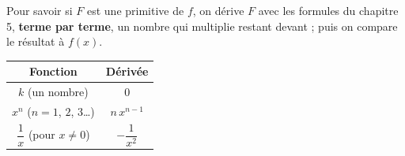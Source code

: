 \documentclass[11pt,a4paper]{article}
\begin{document}
\begin{remarquebox}
\begin{minipage}[c]{0.5\linewidth}\raggedright
Pour savoir si $F$ est une primitive de $f$, on dérive $F$ avec les formules du
chapitre 5, \textbf{terme par terme}, un nombre qui multiplie restant devant ; puis on
compare le résultat à $f(x)$.
\end{minipage}\hfill
\begin{minipage}[c]{0.46\linewidth}\centering
\renewcommand{\arraystretch}{2.4}\setlength{\tabcolsep}{12pt}
\begin{tabular}{|c|c|}
\hline
\textbf{Fonction} & \textbf{Dérivée}\\
\hline
$k$ (un nombre) & $0$\\
\hline
$x^{n}$ \quad ($n=1$, $2$, $3$\dots) & $n\,x^{n-1}$\\
\hline
$\dfrac{1}{x}$ \quad (pour $x\neq 0$) & $-\dfrac{1}{x^{2}}$\\
\hline
\end{tabular}
\end{minipage}
\end{remarquebox}
\end{document}
